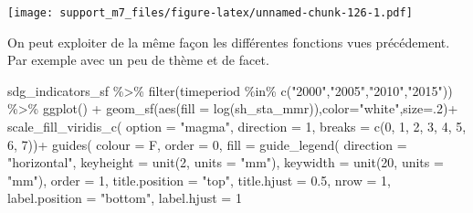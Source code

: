 \documentclass[
]{book}
\newenvironment{Shaded}{\begin{snugshade}}{\end{snugshade}}
\newcommand{\AttributeTok}[1]{\textcolor[rgb]{0.77,0.63,0.00}{#1}}
\newcommand{\DecValTok}[1]{\textcolor[rgb]{0.00,0.00,0.81}{#1}}
\newcommand{\FloatTok}[1]{\textcolor[rgb]{0.00,0.00,0.81}{#1}}
\newcommand{\FunctionTok}[1]{\textcolor[rgb]{0.00,0.00,0.00}{#1}}
\newcommand{\NormalTok}[1]{#1}
\newcommand{\SpecialCharTok}[1]{\textcolor[rgb]{0.00,0.00,0.00}{#1}}
\newcommand{\StringTok}[1]{\textcolor[rgb]{0.31,0.60,0.02}{#1}}
\begin{document}
\texttt{[image: support\_m7\_files/figure-latex/unnamed-chunk-126-1.pdf]}

On peut exploiter de la même façon les différentes fonctions vues précédement. Par exemple avec un peu de thème et de facet.

\begin{Shaded}
\begin{Highlighting}[]
\NormalTok{sdg\_indicators\_sf }\SpecialCharTok{\%\textgreater{}\%} 
  \FunctionTok{filter}\NormalTok{(timeperiod }\SpecialCharTok{\%in\%} \FunctionTok{c}\NormalTok{(}\StringTok{"2000"}\NormalTok{,}\StringTok{"2005"}\NormalTok{,}\StringTok{"2010"}\NormalTok{,}\StringTok{"2015"}\NormalTok{)) }\SpecialCharTok{\%\textgreater{}\%} 
           \FunctionTok{ggplot}\NormalTok{() }\SpecialCharTok{+}
           \FunctionTok{geom\_sf}\NormalTok{(}\FunctionTok{aes}\NormalTok{(}\AttributeTok{fill =} \FunctionTok{log}\NormalTok{(sh\_sta\_mmr)),}\AttributeTok{color=}\StringTok{"white"}\NormalTok{,}\AttributeTok{size=}\NormalTok{.}\DecValTok{2}\NormalTok{)}\SpecialCharTok{+}
           \FunctionTok{scale\_fill\_viridis\_c}\NormalTok{(}
             \AttributeTok{option =} \StringTok{"magma"}\NormalTok{,}
             \AttributeTok{direction =} \DecValTok{1}\NormalTok{,}
             \AttributeTok{breaks =} \FunctionTok{c}\NormalTok{(}\DecValTok{0}\NormalTok{, }\DecValTok{1}\NormalTok{, }\DecValTok{2}\NormalTok{, }\DecValTok{3}\NormalTok{, }\DecValTok{4}\NormalTok{, }\DecValTok{5}\NormalTok{, }\DecValTok{6}\NormalTok{, }\DecValTok{7}\NormalTok{))}\SpecialCharTok{+}
           \FunctionTok{guides}\NormalTok{(}
             \AttributeTok{colour =}\NormalTok{ F,}
             \AttributeTok{order =} \DecValTok{0}\NormalTok{,}
             \AttributeTok{fill =} \FunctionTok{guide\_legend}\NormalTok{(}
               \AttributeTok{direction =} \StringTok{"horizontal"}\NormalTok{,}
               \AttributeTok{keyheight =} \FunctionTok{unit}\NormalTok{(}\DecValTok{2}\NormalTok{, }\AttributeTok{units =} \StringTok{"mm"}\NormalTok{),}
               \AttributeTok{keywidth =} \FunctionTok{unit}\NormalTok{(}\DecValTok{20}\NormalTok{, }\AttributeTok{units =} \StringTok{"mm"}\NormalTok{),}
               \AttributeTok{order =} \DecValTok{1}\NormalTok{,}
               \AttributeTok{title.position =} \StringTok{"top"}\NormalTok{,}
               \AttributeTok{title.hjust =} \FloatTok{0.5}\NormalTok{,}
               \AttributeTok{nrow =} \DecValTok{1}\NormalTok{,}
               \AttributeTok{label.position =} \StringTok{"bottom"}\NormalTok{,}
               \AttributeTok{label.hjust =} \DecValTok{1}

\end{Highlighting}
\end{Shaded}
\end{document}
